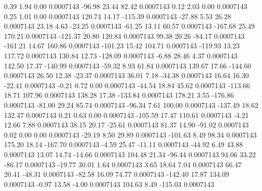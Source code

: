         0.39        1.94        0.00     0.0007143
      -96.98       23.44       82.42     0.0007143
        0.12        2.03        0.00     0.0007143
        0.25        1.01        0.00     0.0007143
      120.74       14.17     -115.39     0.0007143
      -27.88        5.53       26.28     0.0007143
       23.18        4.63      -23.25     0.0007143
      -61.25       13.11       60.57     0.0007143
     -167.68       25.49      170.21     0.0007143
     -121.37       20.80      120.84     0.0007143
       99.38       20.26      -84.17     0.0007143
     -161.21       14.67      160.86     0.0007143
     -101.23       15.42      104.71     0.0007143
     -119.93       13.23      117.72     0.0007143
      130.84       12.73     -128.09     0.0007143
       -6.88       28.46        4.37     0.0007143
      142.50       17.37     -140.99     0.0007143
      -59.32        8.93       61.84     0.0007143
      139.67       17.66     -144.60     0.0007143
       26.50       12.38      -23.37     0.0007143
       36.01        7.18      -34.38     0.0007143
       16.64       16.30      -22.41     0.0007143
       -0.21        0.72        0.00     0.0007143
      -44.54       18.84       45.62     0.0007143
     -113.66       18.71      107.96     0.0007143
      138.28       17.38     -133.84     0.0007143
      178.21        3.55     -176.86     0.0007143
      -81.00       29.24       85.74     0.0007143
      -96.34        7.61      100.00     0.0007143
     -137.49       18.62      132.47     0.0007143
        0.21        0.63        0.00     0.0007143
     -105.59       17.47      110.61     0.0007143
       -4.21       12.66        7.88     0.0007143
       38.15       20.17      -25.61     0.0007143
       81.37       14.90      -91.02     0.0007143
        0.02        0.00        0.00     0.0007143
      -29.19        8.50       29.89     0.0007143
     -101.63        8.49       98.34     0.0007143
      175.20       18.14     -167.70     0.0007143
       -4.59       25.47      -11.11     0.0007143
      -44.92        6.49       43.88     0.0007143
       13.07       14.74      -14.66     0.0007143
      104.48       21.34      -96.44     0.0007143
       94.06       33.22      -86.17     0.0007143
      -19.77       30.01        1.64     0.0007143
        3.65       18.64        7.04     0.0007143
       66.47       20.41      -48.31     0.0007143
      -82.58       16.09       74.77     0.0007143
     -142.40       17.87      134.09     0.0007143
       -0.97       13.58       -4.00     0.0007143
      104.63        8.49     -115.03     0.0007143
